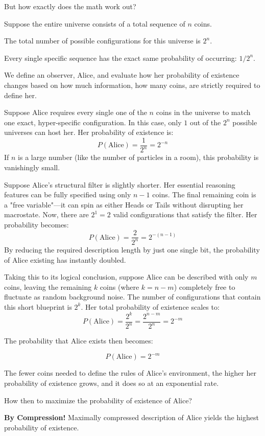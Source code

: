 But how exactly does the math work out? 

Suppose the entire universe consists of a total sequence of $n$ coins.

The total number of possible configurations for this universe is $2^n$.

Every single specific sequence has the exact same probability of occurring: $1/2^n$. 

We define an observer, Alice, and evaluate how her probability of existence changes based on how much information, how many coins, are strictly required to define her.

Suppose Alice requires every single one of the $n$ coins in the universe to match one exact, hyper-specific configuration. In this case, only $1$ out of the $2^n$ possible universes can host her. Her probability of existence is:
$$P(\text{Alice}) = \frac{1}{2^n} = 2^{-n}$$
If $n$ is a large number (like the number of particles in a room), this probability is vanishingly small.
    
Suppose Alice's structural filter is slightly shorter.
Her essential reasoning features can be fully specified using only $n-1$ coins.
The final remaining coin is a "free variable"—it can spin as either Heads or Tails without disrupting her macrostate.
Now, there are $2^1 = 2$ valid configurations that satisfy the filter. Her probability becomes:
    $$P(\text{Alice}) = \frac{2}{2^n} = 2^{-(n-1)}$$
    By reducing the required description length by just one single bit, the probability of Alice existing has instantly doubled.
    
Taking this to its logical conclusion, suppose Alice can be described with only $m$ coins, leaving the remaining $k$ coins (where $k = n-m$) completely free to fluctuate as random background noise.
The number of configurations that contain this short blueprint is $2^k$. Her total probability of existence scales to:
$$P(\text{Alice}) = \frac{2^k}{2^n} = \frac{2^{n-m}}{2^n} = 2^{-m}$$


The probability that Alice exists then becomes:

\[
P(\text{Alice}) = 2^{-m}
\]


The fewer coins needed to define the rules of Alice's environment, the higher her probability of existence grows, and it does so at an exponential rate. 

How then to maximize the probability of existence of Alice? 

\textbf{By Compression!} Maximally compressed description of Alice yields the highest probability of existence.


